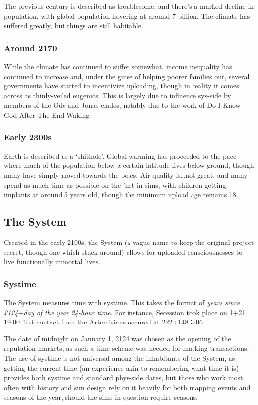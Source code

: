 The previous century is described as troublesome, and there's a marked decline in population, with global population hovering at around 7 billion. The climate has suffered greatly, but things are still habitable.

\subsubsection{Around 2170}

While the climate has continued to suffer somewhat, income inequality has continued to increase and, under the guise of helping poorer families out, several governments have started to incentivize uploading, though in reality it comes across as thinly-veiled eugenics. {This is largely due to influence sys-side by members of the Ode and Jonas clades, notably due to the work of Do I Know God After The End Waking}

\subsubsection{Early 2300s}

Earth is described as a `shithole'. Global warming has proceeded to the pace where much of the population below a certain latitude lives below-ground, though many have simply moved towards the poles. Air quality is\ldots not great, and many spend as much time as possible on the 'net in sims, with children getting implants at around 5 years old, though the minimum upload age remains 18.

\subsection{The System}

Created in the early 2100s, the System (a vague name to keep the original project secret, though one which stuck around) allows for uploaded consciousnesses to live functionally immortal lives.

\subsubsection{Systime}

The System measures time with systime. This takes the format of \emph{years since 2124}+\emph{day of the year} \emph{24-hour time}. For instance, Secession took place on 1+21 19:00 first contact from the Artemisians occured at 222+148 3:06.

The date of midnight on January 1, 2124 was chosen as the opening of the reputation markets, as such a time scheme was needed for marking transactions. The use of systime is not universal among the inhabitants of the System, as getting the current time (an experience akin to remembering what time it is) provides both systime and standard phys-side dates, but those who work most often with history and sim design rely on it heavily for both mapping events and seasons of the year, should the sims in question require seasons.

